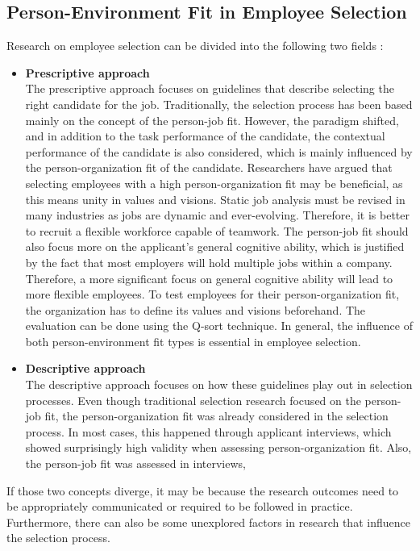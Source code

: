 \documentclass[draft,final]{thesisclass} %
\begin{document}
\subsection{Person-Environment Fit in Employee Selection}
Research on employee selection can be divided into the following two fields \parencite[185-186]{po_and_pj_fit_literature_review}:
\begin{itemize}
    \item \textbf{Prescriptive approach}\\
    The prescriptive approach focuses on guidelines that describe selecting the right candidate for the job.
    Traditionally, the selection process has been based mainly on the concept of the person-job fit.
    However, the paradigm shifted, and in addition to the task performance of the candidate, the contextual performance of the candidate is also considered, which is mainly influenced by the person-organization fit of the candidate.
    Researchers have argued that selecting employees with a high person-organization fit may be beneficial, as this means unity in values and visions.
    Static job analysis must be revised in many industries as jobs are dynamic and ever-evolving. Therefore, it is better to recruit a flexible workforce capable of teamwork.
    The person-job fit should also focus more on the applicant's general cognitive ability, which is justified by the fact that most employers will hold multiple jobs within a company. Therefore, a more significant focus on general cognitive ability will lead to more flexible employees.
    To test employees for their person-organization fit, the organization has to define its values and visions beforehand.
    The evaluation can be done using the Q-sort technique.
    In general, the influence of both person-environment fit types is essential in employee selection.
    \item \textbf{Descriptive approach}\\
    The descriptive approach focuses on how these guidelines play out in selection processes.
    Even though traditional selection research focused on the person-job fit, the person-organization fit was already considered in the selection process.
    In most cases, this happened through applicant interviews, which showed surprisingly high validity when assessing person-organization fit.
    Also, the person-job fit was assessed in interviews, 
\end{itemize}
If those two concepts diverge, it may be because the research outcomes need to be appropriately communicated or required to be followed in practice.
Furthermore, there can also be some unexplored factors in research that influence the selection process.
\end{document}
